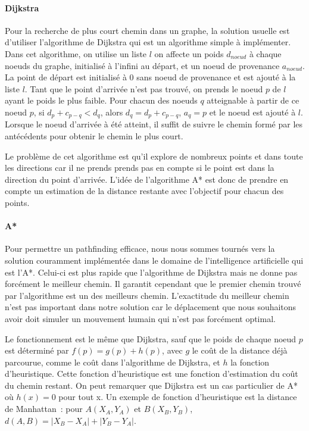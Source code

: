 \paragraph{Dijkstra\\}
Pour la recherche de plus court chemin dans un graphe, la solution usuelle est d'utiliser l'algorithme de Dijkstra qui est un algorithme simple à implémenter.
Dans cet algorithme, on utilise un liste $l$ on affecte un poids $d_{noeud}$ à chaque noeuds du graphe, initialisé à l'infini au départ, et un noeud de provenance $a_{noeud}$.
La point de départ est initialisé à 0 sans noeud de provenance et est ajouté à la liste $l$.
Tant que le point d'arrivée n'est pas trouvé, on prends le noeud $p$ de $l$ ayant le poids le plus faible.
Pour chacun des noeuds $q$ atteignable à partir de ce noeud $p$, si $d_{p} + c_{p-q} < d_{q}$, alors $d_{q} = d_{p} + c_{p-q}$, $a_{q} = p$ et le noeud est ajouté à $l$.
Lorsque le noeud d'arrivée à été atteint, il suffit de suivre le chemin formé par les antécédents pour obtenir le chemin le plus court.

Le problème de cet algorithme est qu'il explore de nombreux points et dans toute les directions car il ne prends prends pas en compte si le point est dans la direction du point d'arrivée.
L'idée de l'algorithme A* est donc de prendre en compte un estimation de la distance restante avec l'objectif pour chacun des points.

\paragraph{A*\\}
Pour permettre un pathfinding efficace, nous nous sommes tournés vers la solution couramment implémentée dans le domaine de l'intelligence artificielle qui est l'A*.
Celui-ci est plus rapide que l'algorithme de Dijkstra mais ne donne pas forcément le meilleur chemin.
Il garantit cependant que le premier chemin trouvé par l'algorithme est un des meilleurs chemin.
L'exactitude du meilleur chemin n'est pas important dans notre solution car le déplacement que nous souhaitons avoir doit simuler un mouvement humain qui n'est pas forcément optimal.

Le fonctionnement est le même que Dijkstra, sauf que le poids de chaque noeud $p$ est déterminé par $f(p) = g(p) + h(p)$, avec $g$ le coût de la distance déjà parcourue, comme le coût dans l'algorithme de Dijkstra, et $h$ la fonction d'heuristique.
Cette fonction d'heuristique est une fonction d'estimation du coût du chemin restant.
On peut remarquer que Dijkstra est un cas particulier de A* où $h(x) = 0$ pour tout x.
Un exemple de fonction d'heuristique est la distance de Manhattan~: pour $A(X_{A}, Y_{A})$ et $B(X_{B}, Y_{B})$, $d(A, B) = |X_{B} - X_{A}| + |Y_{B} - Y_{A}|$.

